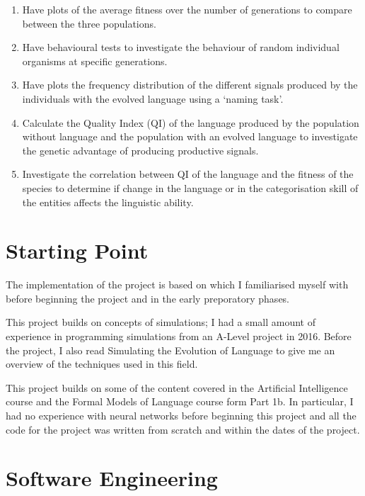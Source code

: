 \documentclass[12pt,a4paper,twoside,openright]{report}
\begin{document}
\begin{enumerate}

\item Have plots of the average fitness over the number of generations to compare between the three populations.

\item Have behavioural tests to investigate the behaviour of random individual organisms at specific generations.

\item Have plots the frequency distribution of the different signals produced by the individuals with the evolved language using a `naming task'.

\item Calculate the Quality Index (QI) of the language produced by the population without language and the population with an evolved language to investigate the genetic advantage of producing productive signals. 

\item Investigate the correlation between QI of the language and the fitness of the species to determine if change in the language or in the categorisation skill of the entities affects the linguistic ability.

\end{enumerate}

\section{Starting Point}\label{section:starting}

The implementation of the project is based on \citet{Cangelosi1998} which I familiarised myself with before beginning the project and in the early preporatory phases.

This project builds on concepts of simulations; I had a small amount of experience in programming simulations from an A-Level project in 2016. Before the project, I also read Simulating the Evolution of Language \citep{Cangelosi2002} to give me an overview of the techniques used in this field. 

This project builds on some of the content covered in the Artificial Intelligence course and the Formal Models of Language course form Part 1b. In particular, I had no experience with neural networks before beginning this project and all the code for the project was written from scratch and within the dates of the project.

\section{Software Engineering}\label{section:software}
\end{document}
